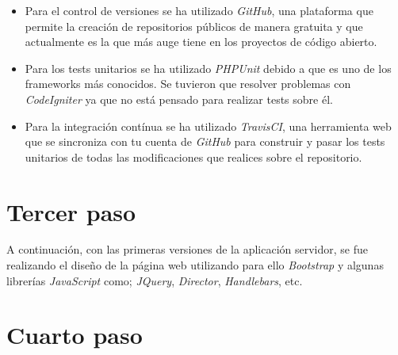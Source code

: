 \begin{itemize}

    \item Para el control de versiones se ha utilizado \emph{GitHub}, una plataforma que permite la creación de repositorios públicos de manera gratuita y que actualmente es la que más auge tiene en los proyectos de código abierto.

    \item Para los tests unitarios se ha utilizado \emph{PHPUnit} debido a que es uno de los frameworks más conocidos. Se tuvieron que resolver problemas con \emph{CodeIgniter} ya que no está pensado para realizar tests sobre él.

    \item Para la integración contínua se ha utilizado \emph{TravisCI}, una herramienta web que se sincroniza con tu cuenta de \emph{GitHub} para construir y pasar los tests unitarios de todas las modificaciones que realices sobre el repositorio.

\end{itemize}

\section{Tercer paso}

A continuación, con las primeras versiones de la aplicación servidor, se fue realizando el diseño de la página web utilizando para ello \emph{Bootstrap} y algunas librerías \emph{JavaScript} como; \emph{JQuery}, \emph{Director}, \emph{Handlebars}, etc.

\section{Cuarto paso}


